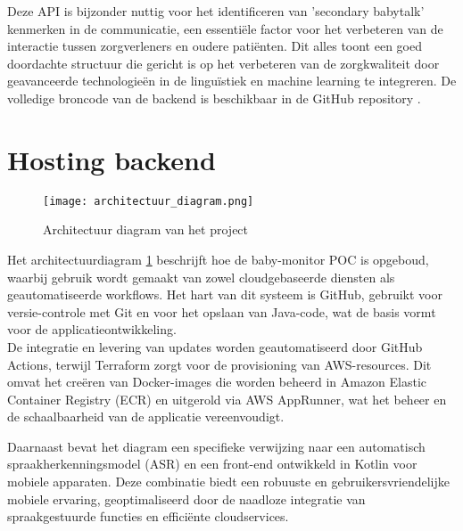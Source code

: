 Deze API is bijzonder nuttig voor het identificeren van 'secondary babytalk' kenmerken in de communicatie, een essentiële factor voor het verbeteren van de interactie tussen zorgverleners en oudere patiënten. Dit alles toont een goed doordachte structuur die gericht is op het verbeteren van de zorgkwaliteit door geavanceerde technologieën in de linguïstiek en machine learning te integreren.
De volledige broncode van de backend is beschikbaar in de GitHub repository \textcite{AitCheikhAhmedBackEnd}.
\section{Hosting backend}
\begin{figure}[h]
    \centering
    \texttt{[image: architectuur\_diagram.png]}
    \captionsetup{justification=centering}
    \caption{Architectuur diagram van het project}
    \label{fig:architectuur}
\end{figure}
\FloatBarrier 
Het architectuurdiagram \ref{fig:architectuur} beschrijft hoe de baby-monitor POC is opgeboud, waarbij gebruik wordt gemaakt van zowel cloudgebaseerde diensten als geautomatiseerde workflows. Het hart van dit systeem is GitHub, gebruikt voor versie-controle met Git en voor het opslaan van Java-code, wat de basis vormt voor de applicatieontwikkeling.
\\
De integratie en levering van updates worden geautomatiseerd door GitHub Actions, terwijl Terraform zorgt voor de provisioning van AWS-resources. Dit omvat het creëren van Docker-images die worden beheerd in Amazon Elastic Container Registry (ECR) en uitgerold via AWS AppRunner, wat het beheer en de schaalbaarheid van de applicatie vereenvoudigt.

Daarnaast bevat het diagram een specifieke verwijzing naar een automatisch spraakherkenningsmodel (ASR) en een front-end ontwikkeld in Kotlin voor mobiele apparaten. Deze combinatie biedt een robuuste en gebruikersvriendelijke mobiele ervaring, geoptimaliseerd door de naadloze integratie van spraakgestuurde functies en efficiënte cloudservices.












